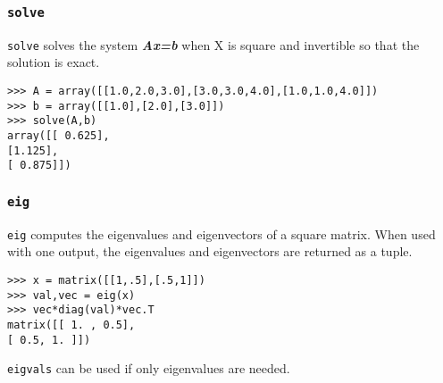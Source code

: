 \documentclass[Pydata.tex]{subfiles}
\begin{document}
\subsubsection*{\texttt{solve}}

\texttt{solve} solves the system \textit{\textbf{Ax=b}} when X is square and invertible so that the solution is exact.
\begin{framed}
\begin{verbatim}
>>> A = array([[1.0,2.0,3.0],[3.0,3.0,4.0],[1.0,1.0,4.0]])
>>> b = array([[1.0],[2.0],[3.0]])
>>> solve(A,b)
array([[ 0.625],
[1.125],
[ 0.875]])
\end{verbatim}
\end{framed}

\subsubsection*{\texttt{eig}}
\texttt{eig} computes the eigenvalues and eigenvectors of a square matrix. When used with one output, the eigenvalues
and eigenvectors are returned as a tuple.
\begin{framed}
\begin{verbatim}
>>> x = matrix([[1,.5],[.5,1]])
>>> val,vec = eig(x)
>>> vec*diag(val)*vec.T
matrix([[ 1. , 0.5],
[ 0.5, 1. ]])
\end{verbatim}
\end{framed}
\texttt{eigvals} can be used if only eigenvalues are needed.
\end{document}
